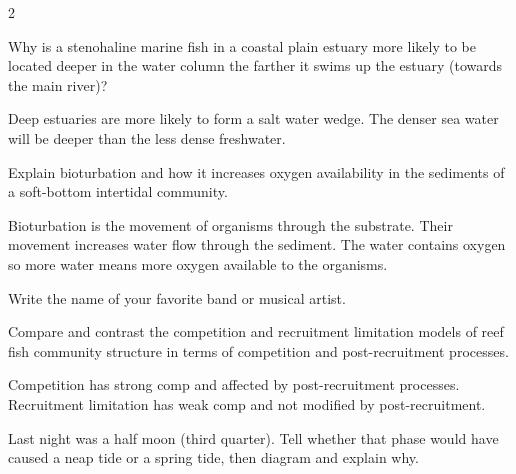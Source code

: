 \documentclass[11pt, addpoints]{exam}
\newcommand*\AnswerBox[2]{%
    \parbox[t][#1]{0.92\textwidth}{%
    \begin{solution}#2\end{solution}}
    \vspace{\stretch{1}}
}
\newlength{\basespace}
\begin{document}
\begin{questions}
\begin{multicols}{2}
	
\end{multicols}

\AnswerBox{0.01\textheight}{}

\question[5]
Why is a stenohaline marine fish in a coastal plain estuary more likely to be located deeper in the water column the farther it swims up the estuary (towards the main river)?

\AnswerBox{0.1\textheight}{Deep estuaries are more likely to form a salt water wedge. The denser sea water will be deeper than the less dense freshwater.}

\question[5]
Explain bioturbation and how it increases oxygen availability in the sediments of a soft-bottom intertidal community.

\AnswerBox{0.1\textheight}{Bioturbation is the movement of organisms through the substrate. Their movement increases water flow through the sediment. The water contains oxygen so more water means more oxygen available to the organisms.}




%
%


\bonusquestion[2]
Write the name of your favorite band or musical artist.


\newpage

\question[10]
Compare and contrast the competition and recruitment limitation models of reef fish community structure in terms of competition and post-recruitment processes.

\AnswerBox{0.4\textheight}{Competition has strong comp and affected by post-recruitment processes. Recruitment limitation has weak comp and not modified by post-recruitment.}




\question[9]
Last night was a half moon (third quarter). Tell whether that phase would have caused a neap tide or a spring tide, then diagram and explain why.


\end{questions}
\end{document}
